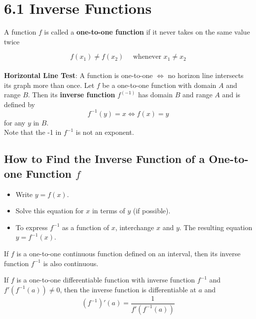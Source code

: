 %
%

\section*{6.1 Inverse Functions}

A function \(f\) is called a \textbf{one-to-one function} if it never takes on the same value twice

\[ f(x_1) \neq f(x_2) \quad \text{ whenever } x_1 \neq x_2 \]
\\
\textbf{Horizontal Line Test}: A function is one-to-one \( \Longleftrightarrow \) no horizon line intersects its graph more than once.
\newline
\noindent
Let \(f\) be a one-to-one function with domain \(A\) and range \(B\). Then its \textbf{inverse function} \(f^(-1)\) has domain \(B\) and range \(A\) and is defined by
\[ f^{-1}(y)=x \Leftrightarrow f(x)=y \]
for any \(y\) in \(B\).
\\
Note that the -1 in \(f^{-1}\) is not an exponent.

\subsection*{How to Find the Inverse Function of a One-to-one Function \(f\)}

\begin{itemize}
  \item Write \( y=f(x) \).
  \item Solve this equation for \(x\) in terms of \(y\) (if possible).
  \item To express \(f^{-1}\) as a function of \(x\), interchange \(x\) and \(y\). The resulting equation \(y=f^{-1}(x)\).
\end{itemize}

\begin{definition}
If \(f\) is a one-to-one continuous function defined on an interval, then its inverse function \(f^{-1}\) is also continuous.
\end{definition}

\begin{definition}
If \(f\) is a one-to-one differentiable function with inverse function \( f^{-1}\) and \(f'(f^{-1}(a)) \neq 0 \), then the inverse function is differentiable at \(a\) and 
\[ (f^{-1})'(a) = \frac{1}{f'(f^{-1}(a))} \]
\end{definition}
